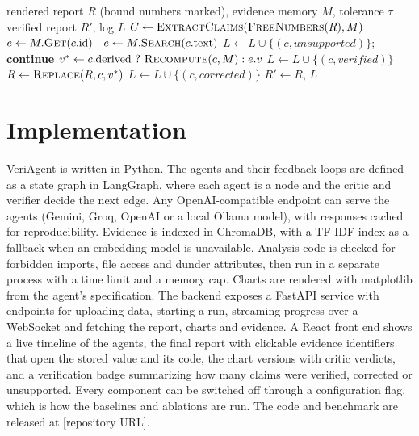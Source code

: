 \documentclass[conference]{IEEEtran}
\begin{document}
\begin{algorithm}[t]
\caption{Claim-level report verification}
\label{alg:verify}
\begin{algorithmic}[1]
\Require rendered report $R$ (bound numbers marked), evidence memory $M$, tolerance $\tau$
\Ensure verified report $R'$, log $L$
\State $C \gets \textsc{ExtractClaims}(\textsc{FreeNumbers}(R), M)$ 
   $e \gets M.\textsc{Get}(c.\mathrm{id})$
  \Else\ $e \gets M.\textsc{Search}(c.\mathrm{text})$
  \EndIf
     \State $L \gets L \cup \{(c, \textit{unsupported})\}$; \textbf{continue}
  \EndIf
  \State $v^{*} \gets c.\mathrm{derived}\ ?\ \textsc{Recompute}(c, M) : e.v$
     \State $L \gets L \cup \{(c, \textit{verified})\}$
  \Else
     \State $R \gets \textsc{Replace}(R, c, v^{*})$
     \State $L \gets L \cup \{(c, \textit{corrected})\}$
  \EndIf
\EndFor
\State \Return $R' \gets R$, $L$
\end{algorithmic}
\end{algorithm}

\section{Implementation}

VeriAgent is written in Python. The agents and their feedback loops are defined as a state graph in LangGraph, where each agent is a node and the critic and verifier decide the next edge. Any OpenAI-compatible endpoint can serve the agents (Gemini, Groq, OpenAI or a local Ollama model), with responses cached for reproducibility. Evidence is indexed in ChromaDB, with a TF-IDF index as a fallback when an embedding model is unavailable. Analysis code is checked for forbidden imports, file access and dunder attributes, then run in a separate process with a time limit and a memory cap. Charts are rendered with matplotlib from the agent's specification. The backend exposes a FastAPI service with endpoints for uploading data, starting a run, streaming progress over a WebSocket and fetching the report, charts and evidence. A React front end shows a live timeline of the agents, the final report with clickable evidence identifiers that open the stored value and its code, the chart versions with critic verdicts, and a verification badge summarizing how many claims were verified, corrected or unsupported. Every component can be switched off through a configuration flag, which is how the baselines and ablations are run. The code and benchmark are released at [repository URL]. %
\end{document}
